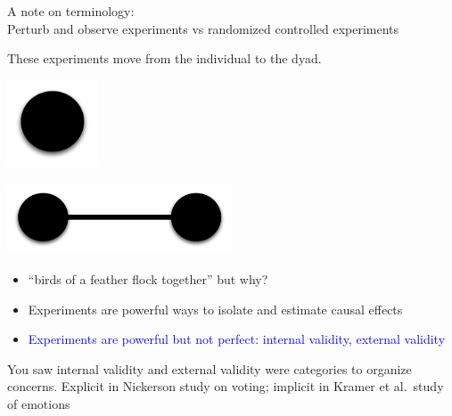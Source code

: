 \documentclass[aspectratio=169]{beamer}
\begin{document}
\begin{frame}

A note on terminology:\\
Perturb and observe experiments vs randomized controlled experiments

\end{frame}
\begin{frame}

These experiments move from the individual to the dyad.

\begin{center}
\includegraphics[width=0.2\textwidth]{figures/point}
\end{center}

\pause

\begin{center}
\includegraphics[width=0.5\textwidth]{figures/dyad}
\end{center}

\end{frame}
\begin{frame}

\begin{itemize}
\item ``birds of a feather flock together'' but why? 
\item Experiments are powerful ways to isolate and estimate causal effects
\item \textcolor{blue}{Experiments are powerful but not perfect: internal validity, external validity}
\end{itemize}

\end{frame}
\begin{frame}

You saw internal validity and external validity were categories to organize concerns. Explicit in Nickerson study on voting; implicit in Kramer et al.\ study of emotions

\end{frame}
\end{document}
